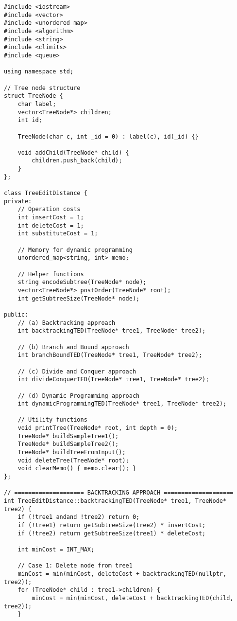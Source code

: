 \documentclass[12pt]{article}
\begin{document}
\begin{lstlisting}[caption=Complete Tree Edit Distance Implementation]
#include <iostream>
#include <vector>
#include <unordered_map>
#include <algorithm>
#include <string>
#include <climits>
#include <queue>

using namespace std;

// Tree node structure
struct TreeNode {
    char label;
    vector<TreeNode*> children;
    int id;
    
    TreeNode(char c, int _id = 0) : label(c), id(_id) {}
    
    void addChild(TreeNode* child) {
        children.push_back(child);
    }
};

class TreeEditDistance {
private:
    // Operation costs
    int insertCost = 1;
    int deleteCost = 1;
    int substituteCost = 1;
    
    // Memory for dynamic programming
    unordered_map<string, int> memo;
    
    // Helper functions
    string encodeSubtree(TreeNode* node);
    vector<TreeNode*> postOrder(TreeNode* root);
    int getSubtreeSize(TreeNode* node);
    
public:
    // (a) Backtracking approach
    int backtrackingTED(TreeNode* tree1, TreeNode* tree2);
    
    // (b) Branch and Bound approach
    int branchBoundTED(TreeNode* tree1, TreeNode* tree2);
    
    // (c) Divide and Conquer approach
    int divideConquerTED(TreeNode* tree1, TreeNode* tree2);
    
    // (d) Dynamic Programming approach
    int dynamicProgrammingTED(TreeNode* tree1, TreeNode* tree2);
    
    // Utility functions
    void printTree(TreeNode* root, int depth = 0);
    TreeNode* buildSampleTree1();
    TreeNode* buildSampleTree2();
    TreeNode* buildTreeFromInput();
    void deleteTree(TreeNode* root);
    void clearMemo() { memo.clear(); }
};

// ==================== BACKTRACKING APPROACH ====================
int TreeEditDistance::backtrackingTED(TreeNode* tree1, TreeNode* tree2) {
    if (!tree1 andand !tree2) return 0;
    if (!tree1) return getSubtreeSize(tree2) * insertCost;
    if (!tree2) return getSubtreeSize(tree1) * deleteCost;
    
    int minCost = INT_MAX;
    
    // Case 1: Delete node from tree1
    minCost = min(minCost, deleteCost + backtrackingTED(nullptr, tree2));
    for (TreeNode* child : tree1->children) {
        minCost = min(minCost, deleteCost + backtrackingTED(child, tree2));
    }
    

\end{lstlisting}
\end{document}

